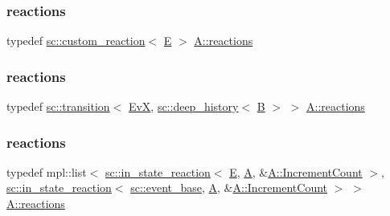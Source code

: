 \subsubsection{\texorpdfstring{reactions}{reactions}\hspace{0.1cm}{\footnotesize\ttfamily [5/13]}}
{\footnotesize\ttfamily typedef \mbox{\hyperlink{classboost_1_1statechart_1_1custom__reaction}{sc\+::custom\+\_\+reaction}}$<$ \mbox{\hyperlink{struct_e}{E}} $>$ \mbox{\hyperlink{struct_a_aaf7ef039e669b21e19f81777afeed659}{A\+::reactions}}}

\mbox{\label{struct_a_a336e15662d0cfb81d1abb41df9fca187}} 
\subsubsection{\texorpdfstring{reactions}{reactions}\hspace{0.1cm}{\footnotesize\ttfamily [6/13]}}
{\footnotesize\ttfamily typedef \mbox{\hyperlink{classboost_1_1statechart_1_1transition}{sc\+::transition}}$<$ \mbox{\hyperlink{struct_ev_x}{EvX}}, \mbox{\hyperlink{classboost_1_1statechart_1_1deep__history}{sc\+::deep\+\_\+history}}$<$ \mbox{\hyperlink{struct_b}{B}} $>$ $>$ \mbox{\hyperlink{struct_a_aaf7ef039e669b21e19f81777afeed659}{A\+::reactions}}}

\mbox{\label{struct_a_a34d11f67d397f777186858587949c5a2}} 
\subsubsection{\texorpdfstring{reactions}{reactions}\hspace{0.1cm}{\footnotesize\ttfamily [7/13]}}
{\footnotesize\ttfamily typedef mpl\+::list$<$ \mbox{\hyperlink{classboost_1_1statechart_1_1in__state__reaction}{sc\+::in\+\_\+state\+\_\+reaction}}$<$ \mbox{\hyperlink{struct_e}{E}}, \mbox{\hyperlink{struct_a}{A}}, \&\mbox{\hyperlink{struct_a_a7811ed8883449fde0d5f59bd2ebf3de5}{A\+::\+Increment\+Count}} $>$, \mbox{\hyperlink{classboost_1_1statechart_1_1in__state__reaction}{sc\+::in\+\_\+state\+\_\+reaction}}$<$ \mbox{\hyperlink{classboost_1_1statechart_1_1event__base}{sc\+::event\+\_\+base}}, \mbox{\hyperlink{struct_a}{A}}, \&\mbox{\hyperlink{struct_a_a7811ed8883449fde0d5f59bd2ebf3de5}{A\+::\+Increment\+Count}} $>$ $>$ \mbox{\hyperlink{struct_a_aaf7ef039e669b21e19f81777afeed659}{A\+::reactions}}}

